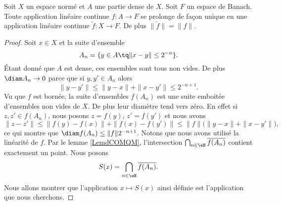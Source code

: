 \begin{proposition}
    Soit \( X\) un espace normé et \( A\) une partie dense de \( X\). Soit \( F\) un espace de Banach. Toute application linéaire continue \( f\colon A\to F\) se prolonge de façon unique en une application linéaire continue \( \tilde f\colon X\to F\). De plus \( \| \tilde f \|=\| f \|\).
\end{proposition}

\begin{proof}
    Soit \( x\in X\) et la suite d'ensemble
    \begin{equation}
        A_n=\{ y\in A\tq \| x-y \|\leq 2^{-n}\}.
    \end{equation}
    Étant donné que \( A\) est dense, ces ensembles sont tous non vides. De plus \( \diam A_n\to 0\) parce que si \( y,y'\in A_n\) alors
    \begin{equation}
        \| y-y' \|\leq\| y-x \|+\| x-y' \|\leq 2^{-n+1}.
    \end{equation}
    Vu que \( f\) est bornée, la suite d'ensembles \( f(A_n)\) est une suite emboitée d'ensembles non vides de \( X\). De plus leur diamètre tend vers zéro. En effet si \( z,z'\in f(A_n)\), nous posons \( z=f(y)\), \( z'=f(y')\) et nous avons
    \begin{equation}
        \| z-z' \|\leq \| f(y)-f(x) \|+\| f(x)-f(y') \|\leq \| f \|\big( \| y-x \|+\| x-y' \| \big),
    \end{equation}
    ce qui montre que \( \diam f(A_n)\leq \| f \|2^{-n+1}\).  Notons que nous avons utilisé la linéarité de \( f\). Par le lemme \ref{LemdCOMQM}, l'intersection \( \bigcap_{n\in \eN}\overline{ f(A_n) }\) contient exactement un point. Nous posons
    \begin{equation}
        S(x)=\bigcap_{n\in \eN}\overline{ f(A_n) }.
    \end{equation}
    Nous allons montrer que l'application \( x\mapsto S(x)\) ainsi définie est l'application que nous cherchons. 


\end{proof}
